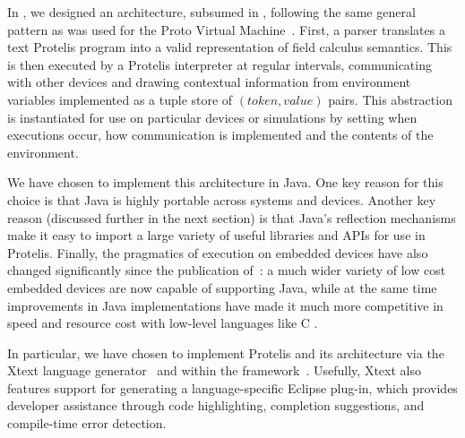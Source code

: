\documentclass[12pt,a4paper,twoside,openright]{book}
\begin{document}
In \protelis{}, we designed an architecture, subsumed in , following the same general pattern as was used for the Proto Virtual Machine~\cite{protokernel}.
%
First, a parser translates a text Protelis program into a valid representation of field calculus semantics.
%
This is then executed by a Protelis interpreter at regular intervals, communicating with other devices and drawing contextual information from environment variables implemented as a tuple store of $(token, value)$ pairs.
%
This abstraction is instantiated for use on particular devices or simulations by setting when executions occur, how communication is implemented and the contents of the environment.

We have chosen to implement this architecture in Java.
%
One key reason for this choice is that Java is highly portable across systems and devices.
%
Another key reason (discussed further in the next section) is that Java's reflection mechanisms make it easy to import a large variety of useful libraries and APIs for use in Protelis.
%
Finally, the pragmatics of execution on embedded devices have also changed significantly since the publication of~\cite{protokernel}: a much wider variety of low cost embedded devices are now capable of supporting Java, while at the same time improvements in Java implementations have made it much more competitive in speed and resource cost with low-level languages like C \cite{bull2003, oancea2011}.

In particular, we have chosen to implement Protelis and its architecture via the Xtext language generator~\cite{eysholdt2010xtext} and within the \alchemist{} framework~\cite{alchemist-jos2013}.
%
Usefully, Xtext also features support for generating a language-specific Eclipse plug-in, which provides developer assistance through code highlighting, completion suggestions, and compile-time error detection.
\end{document}
